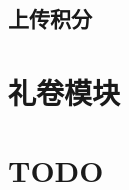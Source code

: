 \documentclass[11pt]{article}
\begin{document}
\subsection{上传积分\label{user_score_submit}}
\label{sec-2-2}

\section{礼卷模块\label{coupon}}
\label{sec-3}



\section{\textbf{TODO}}
\label{sec-4}
\end{document}
